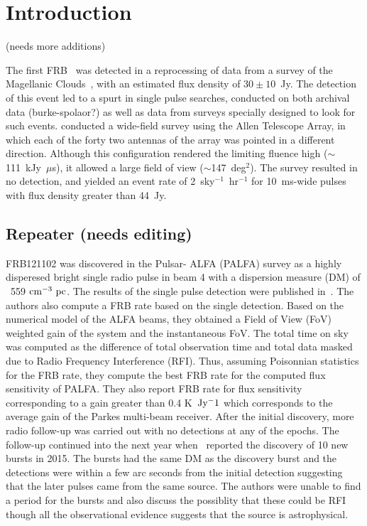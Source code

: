 \documentclass[a4paper,fleqn,usenatbib]{mnras}
\begin{document}
\section{Introduction}

(needs more additions)

The first FRB~\citep{2007Sci...318..777L} was detected in a reprocessing of data from a survey of the Magellanic Clouds~\citep{2006ApJ...649..235M}, with an estimated flux density of $30\pm10$~Jy. The detection of this event led to a spurt in single pulse searches, conducted on both archival data (burke-spolaor?) as well as data from surveys specially designed to look for such events. \citet{2012ApJ...744..109S} conducted a wide-field survey using the Allen Telescope Array, in which each of the forty two antennas of the array was pointed in a different direction. Although this configuration rendered the limiting fluence high ($\sim$111~kJy~$\mu$s), it allowed a large field of view ($\sim$147~deg$^2$). The survey resulted in no detection, and yielded an event rate of 2~sky$^{-1}$~hr$^{-1}$ for 10~ms-wide pulses with flux density greater than 44~Jy.


\subsection{Repeater (needs editing)}
FRB121102 was discovered in the Pulsar- ALFA (PALFA) survey as a highly
disperesed bright single radio pulse in beam 4 with a dispersion measure (DM) of ~559 $\rm cm^{-3}~pc$. The results of the single
pulse detection were published in~\cite{2014ApJ...790..101S}. The authors also compute a FRB rate based on the single detection. Based on the numerical model of
the ALFA beams, they obtained a Field of View (FoV) weighted gain of the 
system and the instantaneous FoV. The total time on sky was computed as the
difference of total observation time and total data masked due to Radio
Frequency Interference (RFI). Thus, assuming Poisonnian statistics for the FRB
rate, they compute the best FRB rate for the computed flux sensitivity of
PALFA. They also report FRB rate for flux sensitivity corresponding to a gain  
greater than 0.4 K~$\rm Jy^-1$ which corresponds to the average gain of the Parkes
multi-beam receiver. After the initial discovery, more radio follow-up was
carried out with no detections at any of the epochs. The follow-up continued
into the next year when~\cite{2016Natur.531..202S} reported the discovery of 10 new
bursts in 2015. The bursts had the same DM as the discovery burst and the 
detections were within a few arc seconds from the initial detection suggesting that the later pulses came from the same source. The authors were
unable to find a period for the bursts and also discuss the possiblity that
these could be RFI though all the observational evidence suggests that the source is
astrophysical.
\end{document}
